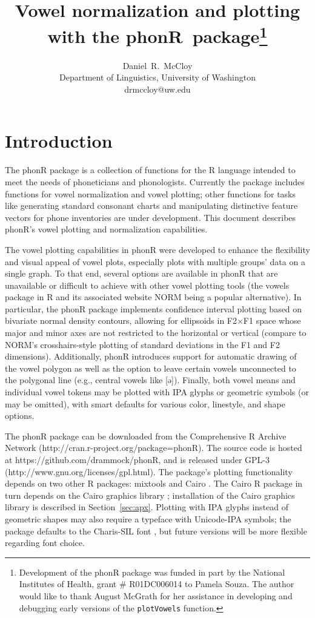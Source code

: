 \documentclass[12pt,oneside]{article}
\title{Vowel normalization and plotting with the phonR~package\footnote{Development of the phonR package was funded in part by the National Institutes of Health, grant \# R01DC006014 to Pamela Souza. The author would like to thank August McGrath for her assistance in developing and debugging early versions of the \texttt{plotVowels} function.}\vspace{-1ex}}
\author{Daniel~R.~McCloy\\Department of Linguistics, University of Washington\\drmccloy@uw.edu\vspace{-1ex}}
\date{} %
\begin{document}
\thispagestyle{plain}
\maketitle

\section{Introduction}
The phonR package is a collection of functions for the R language \citep{r} intended to meet the needs of phoneticians and phonologists.  Currently the package includes functions for vowel normalization and vowel plotting; other functions for tasks like generating standard consonant charts and manipulating distinctive feature vectors for phone inventories are under development.  This document describes phonR's vowel plotting and normalization capabilities.

The vowel plotting capabilities in phonR were developed to enhance the flexibility and visual appeal of vowel plots, especially plots with multiple groups' data on a single graph.  To that end, several options are available in phonR that are unavailable or difficult to achieve with other vowel plotting tools (the vowels package in R \citep{vowelsR} and its associated website NORM \citep{norm} being a popular alternative).  In particular, the phonR package implements confidence interval plotting based on bivariate normal density contours, allowing for ellipsoids in F2×F1 space whose major and minor axes are not restricted to the horizontal or vertical (compare to NORM's crosshairs-style plotting of standard deviations in the F1 and F2 dimensions).  Additionally, phonR introduces support for automatic drawing of the vowel polygon as well as the option to leave certain vowels unconnected to the polygonal line (e.g., central vowels like [ə]).  Finally, both vowel means and individual vowel tokens may be plotted with IPA glyphs or geometric symbols (or may be omitted), with smart defaults for various color, linestyle, and shape options.

The phonR package can be downloaded from the Comprehensive R Archive Network ({\gurl http://cran.r-project.org/package=phonR}). The source code is hosted at {\gurl https://github.com/drammock/phonR}, and is released under GPL-3 ({\gurl http://www.gnu.org/licenses/gpl.html}).  The package's plotting functionality depends on two other R packages: mixtools \citep{mixtools} and Cairo \citep{cairoR}.  The Cairo R package in turn depends on the Cairo graphics library \citep{cairo}; installation of the Cairo graphics library is described in Section~\ref{sec:apx}.  Plotting with IPA glyphs instead of geometric shapes may also require a typeface with Unicode-IPA symbols; the package defaults to the Charis-SIL font \citep{charis}, but future versions will be more flexible regarding font choice.
\end{document}
